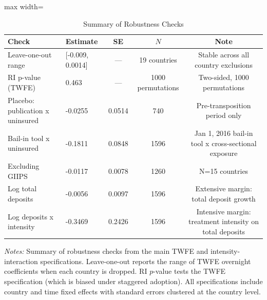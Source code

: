 \begin{table}[H]
\centering
\caption{Summary of Robustness Checks}
\label{tab:robustness}
\begin{adjustbox}{max width=\textwidth}
\begin{tabular}{llccc}
\toprule
Check & Estimate & SE & $N$ & Note \\
\midrule
Leave-one-out range & [-0.009, 0.0014] & --- & 19 countries & Stable across all country exclusions \\
RI p-value (TWFE) & 0.463 & --- & 1000 permutations & Two-sided, 1000 permutations \\
Placebo: publication x uninsured & -0.0255 & 0.0514 & 740 & Pre-transposition period only \\
Bail-in tool x uninsured & -0.1811 & 0.0848 & 1596 & Jan 1, 2016 bail-in tool x cross-sectional exposure \\
Excluding GIIPS & -0.0117 & 0.0078 & 1260 & N=15 countries \\
Log total deposits & -0.0056 & 0.0097 & 1596 & Extensive margin: total deposit growth \\
Log deposits x intensity & -0.3469 & 0.2426 & 1596 & Intensive margin: treatment intensity on total deposits \\
\bottomrule
\end{tabular}
\end{adjustbox}
\begin{tablenotes}[flushleft]
\small
\item \textit{Notes:} Summary of robustness checks from the main TWFE and intensity-interaction specifications. Leave-one-out reports the range of TWFE overnight coefficients when each country is dropped. RI $p$-value tests the TWFE specification (which is biased under staggered adoption). All specifications include country and time fixed effects with standard errors clustered at the country level.
\end{tablenotes}
\end{table}
